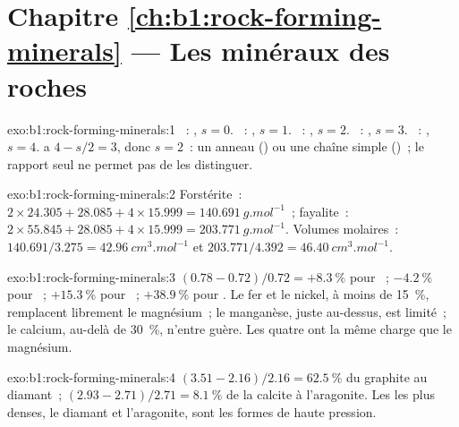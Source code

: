\section*{Chapitre \ref{ch:b1:rock-forming-minerals} --- Les minéraux des roches}

\begin{solution}{exo:b1:rock-forming-minerals:1}
~: , $s = 0$. ~: ,
$s = 1$. ~: , $s = 2$. ~:
, $s = 3$. ~: , $s = 4$. 
a $4 - s/2 = 3$, donc $s = 2$~: un anneau () ou une chaîne simple
()~; le rapport seul ne permet pas de les distinguer.
\end{solution}

\begin{solution}{exo:b1:rock-forming-minerals:2}
Forstérite~: $2\times24.305 + 28.085 + 4\times15.999 =
\qty{140.691}{g.mol^{-1}}$~; fayalite~: $2\times55.845 + 28.085 +
4\times15.999 = \qty{203.771}{g.mol^{-1}}$. Volumes molaires~:
$140.691/3.275 = \qty{42.96}{cm^3.mol^{-1}}$ et $203.771/4.392 =
\qty{46.40}{cm^3.mol^{-1}}$.
\end{solution}

\begin{solution}{exo:b1:rock-forming-minerals:3}
$(0.78 - 0.72)/0.72 = +\qty{8.3}{\percent}$ pour ~;
$-\qty{4.2}{\percent}$ pour ~; $+\qty{15.3}{\percent}$ pour
~; $+\qty{38.9}{\percent}$ pour . Le fer et le nickel, à
moins de \qty{15}{\percent}, remplacent librement le magnésium~; le manganèse,
juste au-dessus, est limité~; le calcium, au-delà de \qty{30}{\percent}, n'entre
guère. Les quatre ont la même charge que le magnésium.
\end{solution}

\begin{solution}{exo:b1:rock-forming-minerals:4}
$(3.51 - 2.16)/2.16 = \qty{62.5}{\percent}$ du graphite au diamant~;
$(2.93 - 2.71)/2.71 = \qty{8.1}{\percent}$ de la calcite à l'aragonite. Les
 les plus denses, le diamant et l'aragonite, sont les formes de haute
pression.
\end{solution}

